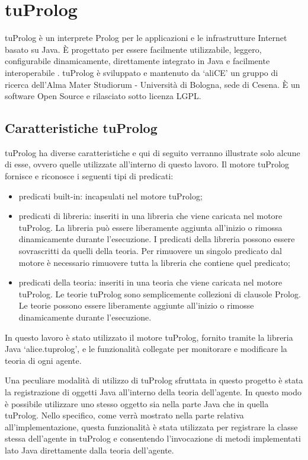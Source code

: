 \section{tuProlog}
tuProlog è un interprete Prolog per le applicazioni e le infrastrutture Internet basato su Java. \`E progettato per essere facilmente utilizzabile, leggero, configurabile dinamicamente, direttamente integrato in Java e facilmente interoperabile \cite{tuProlog}.
tuProlog è sviluppato e mantenuto da `aliCE' un gruppo di ricerca dell'Alma Mater Studiorum - Università di Bologna, sede di Cesena. \`E un software Open Source e rilasciato sotto licenza LGPL.

\subsection{Caratteristiche tuProlog}
tuProlog ha diverse caratteristiche e qui di seguito verranno illustrate solo alcune di esse, ovvero quelle utilizzate all'interno di questo lavoro.
Il motore tuProlog fornisce e riconosce i seguenti tipi di predicati:
\begin{itemize}
\item predicati built-in: incapsulati nel motore tuProlog;
\item predicati di libreria: inseriti in una libreria che viene caricata nel motore tuProlog. La libreria può essere liberamente aggiunta all'inizio o rimossa dinamicamente durante l'esecuzione. I predicati della libreria possono essere sovrascritti da quelli della teoria. Per rimuovere un singolo predicato dal motore è necessario rimuovere tutta la libreria che contiene quel predicato;
\item predicati della teoria: inseriti in una teoria che viene caricata nel motore tuProlog. Le teorie tuProlog sono semplicemente collezioni di clausole Prolog. Le teorie possono essere liberamente aggiunte all'inizio o rimosse dinamicamente durante l'esecuzione.
\end{itemize}

In questo lavoro è stato utilizzato il motore tuProlog, fornito tramite la libreria Java `alice.tuprolog', e le funzionalità collegate per monitorare e modificare la teoria di ogni agente.

Una peculiare modalità di utilizzo di tuProlog sfruttata in questo progetto è stata la registrazione di oggetti Java all'interno della teoria dell'agente. In questo modo è possibile utilizzare uno stesso oggetto sia nella parte Java che in quella tuProlog. Nello specifico, come verrà mostrato nella parte relativa all'implementazione, questa funzionalità è stata utilizzata per registrare la classe stessa dell'agente in tuProlog e consentendo l'invocazione di metodi implementati lato Java direttamente dalla teoria dell'agente.

